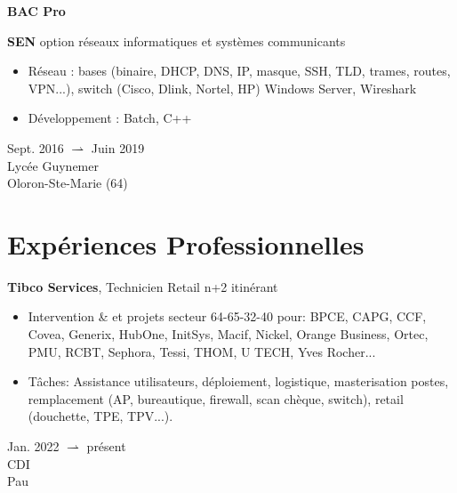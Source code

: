 \documentclass[11pt, a4paper]{article}
\newenvironment{highlights}{
    \begin{itemize}[
        topsep=0.10 cm,
        parsep=0.10 cm,
        partopsep=0pt,
        itemsep=0pt,
        leftmargin=0.4 cm + 10pt
    ]
}{
    \end{itemize}
} %
\newenvironment{twocolentry}[2][]{
    \onecolentry
    \def\secondColumn{#2}
    \setcolumnwidth{\fill, 4.5 cm}
    \begin{paracol}{2}
}{
    \switchcolumn \raggedleft \secondColumn
    \end{paracol}
    \endonecolentry
} %
\newenvironment{threecolentry}[3][]{
    \onecolentry
    \def\thirdColumn{#3}
    \setcolumnwidth{1 cm, \fill, 4.5 cm}
    \begin{paracol}{3}
    {\raggedright #2} \switchcolumn
}{
    \switchcolumn \raggedleft \thirdColumn
    \end{paracol}
    \endonecolentry
} %
\let\hrefWithoutArrow\href
\renewcommand{\href}[2]{\hrefWithoutArrow{#1}{\ifthenelse{\equal{#2}{}}{ }{#2 }\raisebox{.15ex}{\footnotesize \faExternalLink*}}}
\begin{document}
        \vspace{0.2 cm}


        \begin{threecolentry}{\textbf{BAC Pro}}{
            Sept. 2016 $ \rightharpoonup $ Juin 2019 \\
            Lycée Guynemer \\
            Oloron-Ste-Marie (64)
        }
            \textbf{SEN} option réseaux informatiques et systèmes communicants
            \begin{highlights}
                \item Réseau : bases (binaire, DHCP, DNS, IP, masque, SSH, TLD, trames, routes, VPN...), switch (Cisco, Dlink, Nortel, HP) Windows Server, Wireshark
                \item  Développement : Batch, C++
            \end{highlights}
        \end{threecolentry}

    
    \section{Expériences Professionnelles}

        
        \begin{twocolentry}{
            Jan. 2022 $ \rightharpoonup $ présent \\
            CDI \\
            Pau
        }
            \textbf{Tibco Services}, Technicien Retail n+2 itinérant 
            \begin{highlights}
                \item Intervention \href{https://w.wiki/D3ur}{IMAC} \& \href{https://w.wiki/D3uh}{MCO} et projets secteur 64-65-32-40 pour: BPCE, CAPG, CCF, Covea, Generix, HubOne, InitSys, Macif, Nickel, Orange Business, Ortec, PMU, RCBT, Sephora, Tessi, THOM, U TECH, Yves Rocher...
                \item Tâches: Assistance utilisateurs, déploiement, logistique, masterisation postes, remplacement (AP, bureautique, firewall, scan chèque, switch), retail (douchette, TPE, TPV...).
            \end{highlights}
        \end{twocolentry}
\end{document}
